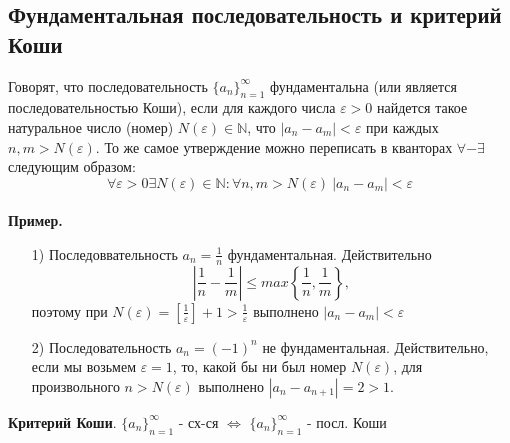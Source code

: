 \documentclass[12pt]{article}
\begin{document}
\subsection{Фундаментальная последовательность и критерий Коши}
Говорят, что последовательность $\{a_n\}^\infty_{n=1}$ фундаментальна (или является последовательностью Коши), если для каждого числа $\varepsilon > 0$ найдется такое натуральное число (номер) $N(\varepsilon) \in \mathds{N}$, что $|a_n - a_m| < \varepsilon$ при каждых $n, m > N(\varepsilon)$. То же самое утверждение можно переписать в кванторах $\forall - \exists$ следующим образом: $$\forall \varepsilon > 0 \exists N(\varepsilon) \in \mathds{N}: \forall n, m > N(\varepsilon) \ |a_n - a_m| < \varepsilon$$ \\ 
\textbf{Пример.} \begin{itemize}
    \item[1)]Последоввательность $a_n =\frac{1}{n}$  фундаментальная. Действительно $$\left|\frac{1}{n} - \frac{1}{m}\right| \leqslant max\left\{\frac{1}{n}, \frac{1}{m}\right\},$$ поэтому при $N(\varepsilon) = \left[\frac{1}{\varepsilon}\right] + 1 > \frac{1}{\varepsilon} \text{ выполнено } |a_n - a_m| < \varepsilon$
    \item[2)] Последовательность $a_n = (-1)^n$ не фундаментальная. Действительно, если мы возьмем  $\varepsilon = 1$, то, какой бы ни был номер $N(\varepsilon)$, для произвольного $n > N(\varepsilon)$ выполнено $|a_n - a_{n+1}| = 2 > 1.$
\end{itemize} 
\textbf{Критерий Коши}. $\{a_n\}_{n=1}^\infty$ - сх-ся $\iff$ $\{a_n\}_{n=1}^\infty$ - посл. Коши
\end{document}
